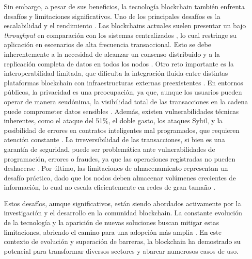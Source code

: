 Sin embargo, a pesar de sus beneficios, la tecnología blockchain también enfrenta desafíos y limitaciones significativos. Uno de los principales desafíos es la escalabilidad y el rendimiento \cite{tripathi2023comprehensive}. Las blockchains actuales suelen presentar un bajo \textit{throughput} en comparación con los sistemas centralizados \cite{baralla2023waste}, lo cual restringe su aplicación en escenarios de alta frecuencia transaccional. Esto se debe inherentemente a la necesidad de alcanzar un consenso distribuido y a la replicación completa de datos en todos los nodos \cite{tripathi2023comprehensive}. Otro reto importante es la interoperabilidad limitada, que dificulta la integración fluida entre distintas plataformas blockchain con infraestructuras externas preexistentes \cite{tripathi2023comprehensive}. En entornos públicos, la privacidad es una preocupación, ya que, aunque los usuarios pueden operar de manera seudónima, la visibilidad total de las transacciones en la cadena puede comprometer datos sensibles \cite{diez2023web, rennock2018blockchain}. Además, existen vulnerabilidades técnicas inherentes, como el ataque del 51\%, el doble gasto, los ataques Sybil, y la posibilidad de errores en contratos inteligentes mal programados, que requieren atención constante \cite{diez2023web}. La irreversibilidad de las transacciones, si bien es una garantía de seguridad, puede ser problemática ante vulnerabilidades de programación, errores o fraudes, ya que las operaciones registradas no pueden deshacerse \cite{taherdoost2023smart}. Por último, las limitaciones de almacenamiento representan un desafío práctico, dado que los nodos deben almacenar volúmenes crecientes de información, lo cual no escala eficientemente en redes de gran tamaño \cite{taherdoost2023smart}.

Estos desafíos, aunque significativos, están siendo abordados activamente por la investigación y el desarrollo en la comunidad blockchain. La constante evolución de la tecnología y la aparición de nuevas soluciones buscan mitigar estas limitaciones, abriendo el camino para una adopción más amplia \cite{tripathi2023comprehensive, baralla2023waste, taherdoost2023smart}. En este contexto de evolución y superación de barreras, la blockchain ha demostrado su potencial para transformar diversos sectores y abarcar numerosos casos de uso.


